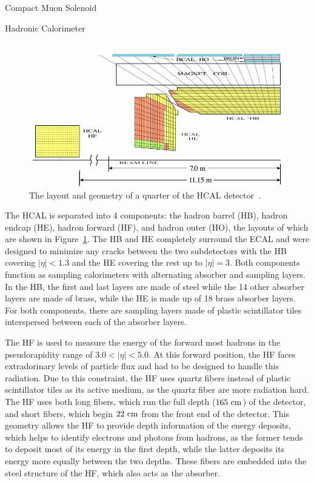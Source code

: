 \begin{section}{Compact Muon Solenoid}
\begin{subsection}{Hadronic Calorimeter}
\begin{figure}[tbp!]
\begin{center}
\includegraphics[angle=0,width=0.80\columnwidth]{fig/cms_hcal.png}
\end{center}
\caption{The layout and geometry of a quarter of the HCAL detector~\cite{1748-0221-5-03-T03014}.}
\label{fig:cms_hcal}
\end{figure}

The HCAL is separated into 4 components: the hadron barrel (HB), hadron endcap (HE), hadron forward (HF), and hadron outer (HO), the layouts of which are shown in Figure~\ref{fig:cms_hcal}.
The HB and HE completely surround the ECAL and were designed to minimize any cracks between the two subdetectors with the HB covering $|\eta| < 1.3$ and the HE covering the rest up to $|\eta| = 3$.
Both components function as sampling calorimeters with alternating absorber and sampling layers.
In the HB, the first and last layers are made of steel while the 14 other absorber layers are made of brass, while the HE is made up of 18 brass absorber layers.
For both components, there are sampling layers made of plastic scintillator tiles interspersed between each of the absorber layers.

The HF is used to measure the energy of the forward most hadrons in the pseudorapidity range of $3.0 < |\eta| < 5.0$.
At this forward position, the HF faces extradorinary levels of particle flux and had to be designed to handle this radiation.
Due to this constraint, the HF uses quartz fibers instead of plastic scintillator tiles as its active medium, as the quartz fiber are more radiation hard.
The HF uses both long fibers, which run the full depth ($165~\mathrm{cm}$) of the detector, and short fibers, which begin $22~\mathrm{cm}$ from the front end of the detector.
This geometry allows the HF to provide depth information of the energy deposits, which helps to identify electrons and photons from hadrons, as the former tends to deposit most of its energy in the first depth, while the latter deposits its energy more equally between the two depths.
These fibers are embedded into the steel structure of the HF, which also acts as the absorber.


\end{subsection}
\end{section}
